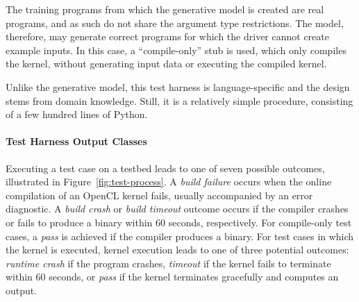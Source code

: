 The training programs from which the generative model is created are real programs, and as such do not share the argument type restrictions. The model, therefore, may generate correct programs for which the driver cannot create example inputs. In this case, a ``compile-only'' stub is used, which only compiles the kernel, without generating input data or executing the compiled kernel.

Unlike the generative model, this test harness is language-specific and the design stems from domain knowledge. Still, it is a relatively simple procedure, consisting of a few hundred lines of Python.


\paragraph*{Test Harness Output Classes}

Executing a test case on a testbed leads to one of seven possible outcomes, illustrated in Figure~\ref{fig:test-process}. A \emph{build failure} occurs when the online compilation of an OpenCL kernel fails, usually accompanied by an error diagnostic. A \emph{build crash} or \emph{build timeout} outcome occurs if the compiler crashes or fails to produce a binary within 60 seconds, respectively. For compile-only test cases, a \emph{pass} is achieved if the compiler produces a binary. For test cases in which the kernel is executed, kernel execution leads to one of three potential outcomes: \emph{runtime crash} if the program crashes, \emph{timeout} if the kernel fails to terminate within 60 seconds, or \emph{pass} if the kernel terminates gracefully and computes an output.

